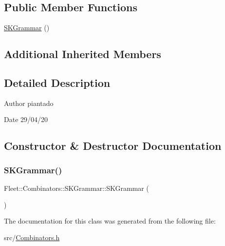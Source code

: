 \subsection*{Public Member Functions}
\begin{DoxyCompactItemize}
\item 
\hyperlink{class_fleet_1_1_combinators_1_1_s_k_grammar_a92f0ff506d59ba4f0f5c200ec3da4c3b}{S\+K\+Grammar} ()
\end{DoxyCompactItemize}
\subsection*{Additional Inherited Members}


\subsection{Detailed Description}
\begin{DoxyAuthor}{Author}
piantado 
\end{DoxyAuthor}
\begin{DoxyDate}{Date}
29/04/20 
\end{DoxyDate}


\subsection{Constructor \& Destructor Documentation}
\mbox{\label{class_fleet_1_1_combinators_1_1_s_k_grammar_a92f0ff506d59ba4f0f5c200ec3da4c3b}} 
\subsubsection{\texorpdfstring{S\+K\+Grammar()}{SKGrammar()}}
{\footnotesize\ttfamily Fleet\+::\+Combinators\+::\+S\+K\+Grammar\+::\+S\+K\+Grammar (\begin{DoxyParamCaption}{ }\end{DoxyParamCaption})\hspace{0.3cm}{\ttfamily [inline]}}



The documentation for this class was generated from the following file\+:\begin{DoxyCompactItemize}
\item 
src/\hyperlink{_combinators_8h}{Combinators.\+h}\end{DoxyCompactItemize}
